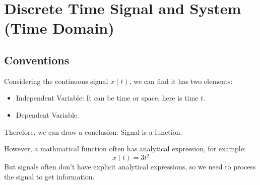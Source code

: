 \section{Discrete Time Signal and System (Time Domain)}
    \subsection{Conventions}
    Considering the continuous signal $x(t)$, we can find it has two elements:
        \begin{itemize}
            \item Independent Variable: It can be time or space, here is time $t$.
            \item Dependent Variable.
        \end{itemize}
    Therefore, we can draw a conclusion: Signal is a function.

    However, a mathmatical function often has analytical expression, for example:
        \begin{equation}
            x(t) = 3t^2
        \end{equation}
    But signals often don't have explicit analytical expressions, 
    so we need to process the signal to get information.

